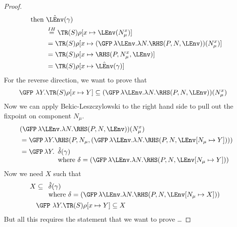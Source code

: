 \begin{proof}
\begin{align*}
    \text{then } & \hat\LEnv (\gamma) \\
                        &\stackrel{IH}= \TR (S)\rho[x \mapsto \LEnv (N_\mu^x)] \\
                        &= \TR (S)\rho[x \mapsto (\GFP\, \lambda \LEnv. \lambda N. \RHS (P, N, \LEnv)) (N_\mu^x)] \\
                        &= \TR (S)\rho[x \mapsto \RHS (P, N_\mu^x, \LEnv)] \\
                        &= \TR (S)\rho[x \mapsto \hat\LEnv (\gamma)] \\
  \end{align*}
  For the reverse direction, we want to prove that
  \begin{align}\label{eq:3}
    \GFP\ \lambda Y. \TR (S) \rho[x \mapsto Y] & \subseteq (\GFP\, \lambda \LEnv. \lambda N. \RHS (P, N, \LEnv)) (N_\mu^x)
  \end{align}
  Now we can apply Bekic-Leszczylowski to the right hand side to pull out the fixpoint on component
  $N_\mu$.
  \begin{align*}
    & (\GFP\, \lambda \LEnv. \lambda N. \RHS (P, N, \LEnv)) (N_\mu^x) \\
    &= \GFP\, \lambda Y. \RHS (P, N_\mu, (\GFP\, \lambda \LEnv. \lambda N. \RHS (P, N, \LEnv[N_\mu
      \mapsto Y])) ) \\
    &= \GFP\, \lambda Y.
      \begin{array}[t]{l}
        \hat\delta (\gamma) \\
        \text{where}\ \delta = (\GFP\, \lambda \LEnv. \lambda N. \RHS (P, N, \LEnv[N_\mu
      \mapsto Y]))
      \end{array}
  \end{align*}
  Now we need $X$ such that
  \begin{align*}
    X &\subseteq \begin{array}[t]{l}
        \hat\delta (\gamma) \\
        \text{where}\ \delta = (\GFP\, \lambda \LEnv. \lambda N. \RHS (P, N, \LEnv[N_\mu
      \mapsto X]))
      \end{array}
    \\
    & \GFP\ \lambda Y. \TR (S) \rho[x \mapsto Y] \subseteq X
  \end{align*}
  But all this requires the statement that we want to prove \dots


\end{proof}
